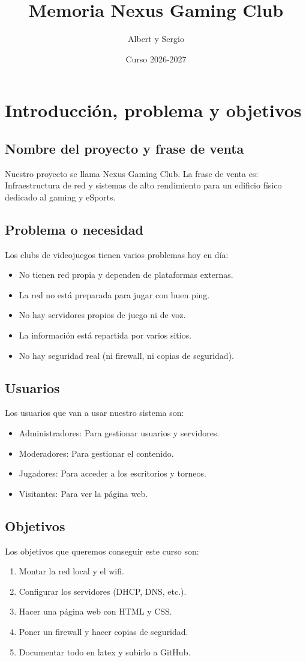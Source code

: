\documentclass{article}
\title{Memoria Nexus Gaming Club}
\author{Albert y Sergio}
\date{Curso 2026-2027}
\begin{document}
\maketitle

\section{Introducción, problema y objetivos}

\subsection{Nombre del proyecto y frase de venta}
Nuestro proyecto se llama Nexus Gaming Club. 
La frase de venta es: Infraestructura de red y sistemas de alto rendimiento para un edificio físico dedicado al gaming y eSports.

\subsection{Problema o necesidad}
Los clubs de videojuegos tienen varios problemas hoy en día:
\begin{itemize}
    \item No tienen red propia y dependen de plataformas externas.
    \item La red no está preparada para jugar con buen ping.
    \item No hay servidores propios de juego ni de voz.
    \item La información está repartida por varios sitios.
    \item No hay seguridad real (ni firewall, ni copias de seguridad).
\end{itemize}

\subsection{Usuarios}
Los usuarios que van a usar nuestro sistema son:
\begin{itemize}
    \item Administradores: Para gestionar usuarios y servidores.
    \item Moderadores: Para gestionar el contenido.
    \item Jugadores: Para acceder a los escritorios y torneos.
        \item Visitantes: Para ver la página web.
\end{itemize}

\subsection{Objetivos}
Los objetivos que queremos conseguir este curso son:
\begin{enumerate}
    \item Montar la red local y el wifi.
    \item Configurar los servidores (DHCP, DNS, etc.).
    \item Hacer una página web con HTML y CSS.
    \item Poner un firewall y hacer copias de seguridad.
    \item Documentar todo en latex y subirlo a GitHub.
\end{enumerate}
\end{document}
